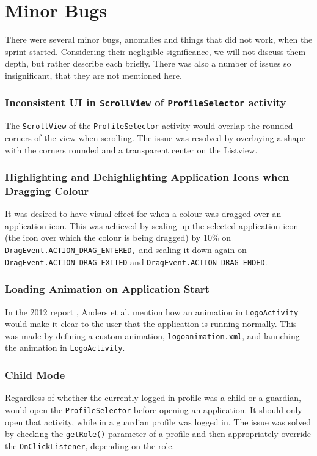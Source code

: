\section{Minor Bugs}

There were several minor bugs, anomalies and things that did not work, when the sprint started.
Considering their negligible significance, we will not discuss them depth, but rather describe each briefly.
There was also a number of issues so insignificant, that they are not mentioned here.

\subsubsection*{Inconsistent UI in \lstinline{ScrollView} of \lstinline{ProfileSelector} activity}
The \lstinline{ScrollView} of the \lstinline{ProfileSelector} activity would overlap the rounded corners of the view when scrolling.
The issue was resolved by overlaying a shape with the corners rounded and a transparent center on the Listview.

\subsubsection*{Highlighting and Dehighlighting Application Icons when Dragging Colour}
It was desired to have visual effect for when a colour was dragged over an application icon.
This was achieved by scaling up the selected application icon (the icon over which the colour is being dragged) by 10\% on \lstinline{DragEvent.ACTION_DRAG_ENTERED,} and scaling it down again on \lstinline{DragEvent.ACTION_DRAG_EXITED} and \lstinline{DragEvent.ACTION_DRAG_ENDED}.

\subsubsection*{Loading Animation on Application Start}
In the 2012 report \cite{launcher2012}, Anders et al. mention how an animation in \lstinline{LogoActivity} would make it clear to the user that the application is running normally.
This was made by defining a custom animation, \lstinline{logoanimation.xml}, and launching the animation in \lstinline{LogoActivity}.

\subsubsection*{Child Mode}
Regardless of whether the currently logged in profile was a child or a guardian, \launcher would open the \lstinline{ProfileSelector} before opening an application.
It should only open that activity, while in a guardian profile was logged in.
The issue was solved by checking the \lstinline{getRole()} parameter of a profile and then appropriately override the \lstinline{OnClickListener}, depending on the role. 

